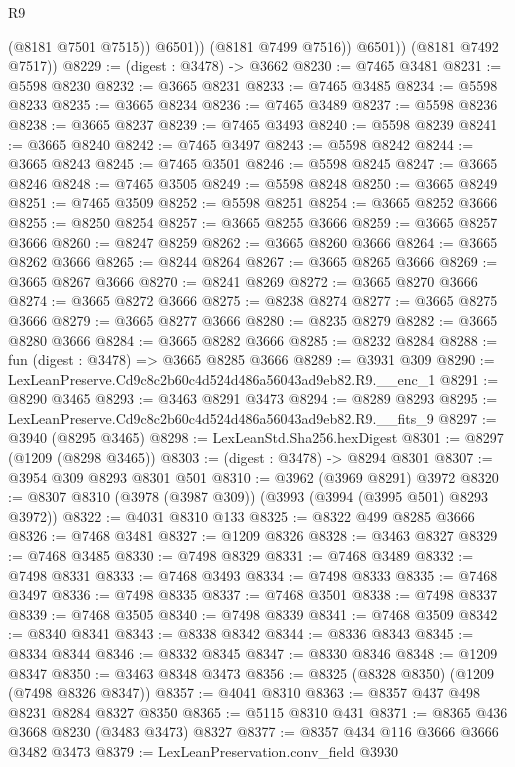 \begin{lexlean}{R9}
\begin{coremodule}
                  (@8181 @7501 @7515))
                @6501))
            (@8181 @7499 @7516))
          @6501))
      (@8181 @7492 @7517))
@8229 := (digest : @3478) -> @3662
@8230 := @7465 @3481
@8231 := @5598 @8230
@8232 := @3665 @8231
@8233 := @7465 @3485
@8234 := @5598 @8233
@8235 := @3665 @8234
@8236 := @7465 @3489
@8237 := @5598 @8236
@8238 := @3665 @8237
@8239 := @7465 @3493
@8240 := @5598 @8239
@8241 := @3665 @8240
@8242 := @7465 @3497
@8243 := @5598 @8242
@8244 := @3665 @8243
@8245 := @7465 @3501
@8246 := @5598 @8245
@8247 := @3665 @8246
@8248 := @7465 @3505
@8249 := @5598 @8248
@8250 := @3665 @8249
@8251 := @7465 @3509
@8252 := @5598 @8251
@8254 := @3665 @8252 @3666
@8255 := @8250 @8254
@8257 := @3665 @8255 @3666
@8259 := @3665 @8257 @3666
@8260 := @8247 @8259
@8262 := @3665 @8260 @3666
@8264 := @3665 @8262 @3666
@8265 := @8244 @8264
@8267 := @3665 @8265 @3666
@8269 := @3665 @8267 @3666
@8270 := @8241 @8269
@8272 := @3665 @8270 @3666
@8274 := @3665 @8272 @3666
@8275 := @8238 @8274
@8277 := @3665 @8275 @3666
@8279 := @3665 @8277 @3666
@8280 := @8235 @8279
@8282 := @3665 @8280 @3666
@8284 := @3665 @8282 @3666
@8285 := @8232 @8284
@8288 := fun (digest : @3478) => @3665 @8285 @3666
@8289 := @3931 @309
@8290 := LexLeanPreserve.Cd9c8c2b60c4d524d486a56043ad9eb82.R9.__enc_1
@8291 := @8290 @3465
@8293 := @3463 @8291 @3473
@8294 := @8289 @8293
@8295 := LexLeanPreserve.Cd9c8c2b60c4d524d486a56043ad9eb82.R9.__fits_9
@8297 := @3940 (@8295 @3465)
@8298 := LexLeanStd.Sha256.hexDigest
@8301 := @8297 (@1209 (@8298 @3465))
@8303 := (digest : @3478) -> @8294 @8301
@8307 := @3954 @309 @8293 @8301 @501
@8310 := @3962 (@3969 @8291) @3972
@8320 := @8307 @8310 (@3978 (@3987 @309)) (@3993 (@3994 (@3995 @501) @8293 @3972))
@8322 := @4031 @8310 @133
@8325 := @8322 @499 @8285 @3666
@8326 := @7468 @3481
@8327 := @1209 @8326
@8328 := @3463 @8327
@8329 := @7468 @3485
@8330 := @7498 @8329
@8331 := @7468 @3489
@8332 := @7498 @8331
@8333 := @7468 @3493
@8334 := @7498 @8333
@8335 := @7468 @3497
@8336 := @7498 @8335
@8337 := @7468 @3501
@8338 := @7498 @8337
@8339 := @7468 @3505
@8340 := @7498 @8339
@8341 := @7468 @3509
@8342 := @8340 @8341
@8343 := @8338 @8342
@8344 := @8336 @8343
@8345 := @8334 @8344
@8346 := @8332 @8345
@8347 := @8330 @8346
@8348 := @1209 @8347
@8350 := @3463 @8348 @3473
@8356 := @8325 (@8328 @8350) (@1209 (@7498 @8326 @8347))
@8357 := @4041 @8310
@8363 := @8357 @437 @498 @8231 @8284 @8327 @8350
@8365 := @5115 @8310 @431
@8371 := @8365 @436 @3668 @8230 (@3483 @3473) @8327
@8377 := @8357 @434 @116 @3666 @3666 @3482 @3473
@8379 := LexLeanPreservation.conv_field @3930

\end{coremodule}
\end{lexlean}
